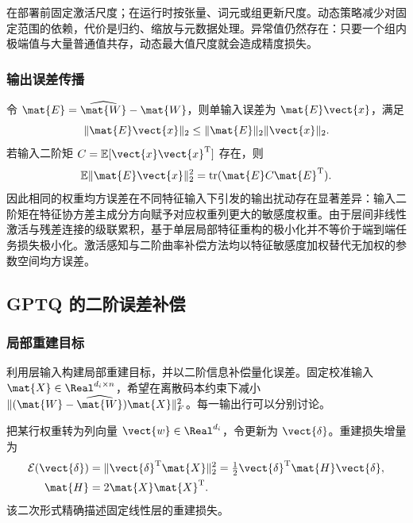 \documentclass[../textbook.tex]{subfiles}
\begin{document}
在部署前固定激活尺度；在运行时按张量、词元或组更新尺度。动态策略减少对固定范围的依赖，代价是归约、缩放与元数据处理。异常值仍然存在：只要一个组内极端值与大量普通值共存，动态最大值尺度就会造成精度损失。

\subsubsection{输出误差传播}
令 $\mat{E}=\widehat{\mat{W}}-\mat{W}$，则单输入误差为 $\mat{E}\vect{x}$，满足
\begin{equation}
\|\mat{E}\vect{x}\|_2\le\|\mat{E}\|_2\|\vect{x}\|_2.
\end{equation}
若输入二阶矩 $C=\mathbb E[\vect{x}\vect{x}^{\mathrm{T}}]$ 存在，则
\begin{equation}
\mathbb E\|\mat{E}\vect{x}\|_2^2=\operatorname{tr}(\mat{E}C\mat{E}^{\mathrm{T}}).
\label{eq:opt-outputerror}
\end{equation}
因此相同的权重均方误差在不同特征输入下引发的输出扰动存在显著差异：输入二阶矩在特征协方差主成分方向赋予对应权重列更大的敏感度权重。由于层间非线性激活与残差连接的级联累积，基于单层局部特征重构的极小化并不等价于端到端任务损失极小化。激活感知与二阶曲率补偿方法均以特征敏感度加权替代无加权的参数空间均方误差。

\subsection{GPTQ 的二阶误差补偿}
\optional
\subsubsection{局部重建目标}
利用层输入构建局部重建目标，并以二阶信息补偿量化误差\cite{frantar2023gptq}。固定校准输入 $\mat{X}\in\Real^{d_i\times n}$，希望在离散码本约束下减小 $\|(\mat{W}-\widehat{\mat{W}})\mat{X}\|_F^2$。每一输出行可以分别讨论。

把某行权重转为列向量 $\vect{w}\in\Real^{d_i}$，令更新为 $\vect{\delta}$。重建损失增量为
\begin{equation}
\begin{aligned}
 \mathcal E(\vect{\delta}) &= \|\vect{\delta}^{\mathrm{T}}\mat{X}\|_2^2 = \tfrac12\vect{\delta}^{\mathrm{T}}\mat{H}\vect{\delta}, \\
 \mat{H} &= 2\mat{X}\mat{X}^{\mathrm{T}}.
\end{aligned}
\end{equation}
该二次形式精确描述固定线性层的重建损失。
\end{document}

